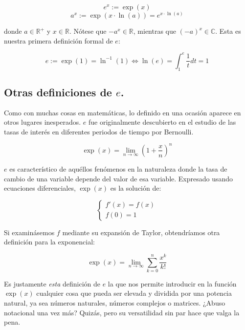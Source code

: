 $$e^x := \exp(x)$$
$$a^x := \exp(x\cdot \ln(a)) = e^{x\cdot \ln(a)}$$

donde $a\in \mathbb{R}^+$ y $x\in \mathbb{R}$. Nótese que $-a^x \in \mathbb{R}$, mientras que $(-a)^x \in \mathbb{C}$. Esta es nuestra primera definición formal de $e$:

$$e := \exp(1) = \ln^{-1}(1) \iff \ln(e) = \int_{1}^{e} \frac{1}{t} dt = 1$$

\subsection{Otras definiciones de $e$.}

Como con muchas cosas en matemáticas, lo definido en una ocasión aparece en otros lugares inesperados. $e$ fue originalmente descubierto en el estudio de las tasas de interés en diferentes periodos de tiempo por Bernoulli.

$$\exp(x) = \lim_{n \to \infty} \left(1 + \frac{x}{n}\right)^n$$

$e$ es característico de aquéllos fenómenos en la naturaleza donde la tasa de cambio de una variable depende del valor de esa variable. Expresado usando ecuaciones diferenciales, $\exp(x)$ es la solución de:

\begin{equation}
	\begin{cases}
		f'(x) = f(x) \\
		f(0) = 1
	\end{cases}
\end{equation}

Si examinásemos $f$ mediante su expansión de Taylor, obtendríamos otra definición para la exponencial:

$$\exp(x) = \lim_{n \to \infty} \sum\limits_{k = 0}^{n} \frac{x^k}{k!}$$

Es justamente \textit{esta} definición de $e$ la que nos permite introducir en la función $\exp(x)$ cualquier cosa que pueda ser elevada y dividida por una potencia natural, ya sea números naturales, números complejos o matrices. ¿Abuso notacional una vez más? Quizás, pero su versatilidad sin par hace que valga la pena.

\newpage
